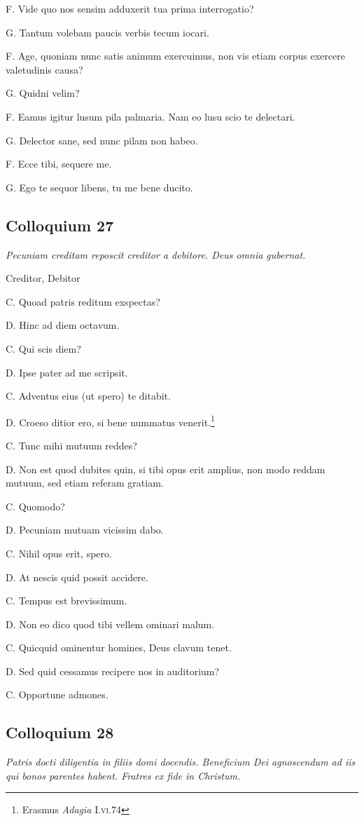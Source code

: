 \documentclass{article}
\begin{document}
F. Vide quo nos sensim adduxerit tua prima interrogatio? 

G. Tantum volebam paucis verbis tecum iocari. 

F. Age, quoniam nunc satis animum exercuimus, non vis etiam corpus exercere valetudinis causa?

G. Quidni velim?

F. Eamus igitur lusum pila palmaria. Nam eo lusu scio te delectari. 

G. Delector sane, sed nunc pilam non habeo. 

F. Ecce tibi, sequere me. 

G. Ego te sequor libens, tu me bene ducito. 

\subsection{Colloquium 27}
\emph{Pecuniam creditam reposcit creditor a debitore. Deus omnia gubernat.}

Creditor, Debitor

C. Quoad patris reditum exspectas?

D. Hinc ad diem octavum. 

C. Qui scis diem?

D. Ipse pater ad me scripsit. 

C. Adventus eius (ut spero) te ditabit. 

D. Croeso ditior ero, si bene nummatus venerit.\footnote{Erasmus \emph{Adagia} I.\textsc{vi}.74}

C. Tunc mihi mutuum reddes?

D. Non est quod dubites quin, si tibi opus erit amplius, non modo reddam mutuum, sed etiam referam gratiam. 

C. Quomodo?

D. Pecuniam mutuam vicissim dabo. 

C. Nihil opus erit, spero. 

D. At nescis quid possit accidere. 

C. Tempus est brevissimum. 

D. Non eo dico quod tibi vellem ominari malum. 

C. Quicquid ominentur homines, Deus clavum tenet. 

D. Sed quid cessamus recipere nos in auditorium?

C. Opportune admones. 

\subsection{Colloquium 28}
\emph{Patris docti diligentia in filiis domi docendis. Beneficium Dei agnoscendum ad iis qui bonos parentes habent. Fratres ex fide in Christum.}
\end{document}
